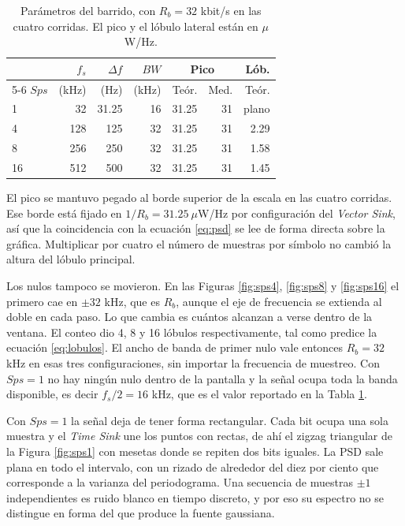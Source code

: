 \documentclass[twocolumn]{IEEEtran}
\begin{document}
\begin{table}[!ht]
\centering
\caption{Parámetros del barrido, con $R_b = 32$ kbit/s en las cuatro corridas. El pico y el lóbulo lateral están en $\mu$W/Hz.}
\label{tab:barrido}
\footnotesize
\begin{tabular}{@{}lrrrrrr@{}}
\toprule
 & $f_s$ & $\Delta f$ & $BW$ & \multicolumn{2}{c}{\textbf{Pico}} & \textbf{Lób.} \\
\cmidrule(lr){5-6}
$Sps$ & (kHz) & (Hz) & (kHz) & Teór. & Med. & Teór. \\
\midrule
1  & 32  & 31.25 & 16 & 31.25 & 31 & plano \\
4  & 128 & 125   & 32 & 31.25 & 31 & 2.29 \\
8  & 256 & 250   & 32 & 31.25 & 31 & 1.58 \\
16 & 512 & 500   & 32 & 31.25 & 31 & 1.45 \\
\bottomrule
\end{tabular}
\end{table}

El pico se mantuvo pegado al borde superior de la escala en las cuatro corridas. Ese borde está fijado en $1/R_b = 31.25\ \mu$W/Hz por configuración del \textit{Vector Sink}, así que la coincidencia con la ecuación \eqref{eq:psd} se lee de forma directa sobre la gráfica. Multiplicar por cuatro el número de muestras por símbolo no cambió la altura del lóbulo principal.

Los nulos tampoco se movieron. En las Figuras \ref{fig:sps4}, \ref{fig:sps8} y \ref{fig:sps16} el primero cae en $\pm 32$ kHz, que es $R_b$, aunque el eje de frecuencia se extienda al doble en cada paso. Lo que cambia es cuántos alcanzan a verse dentro de la ventana. El conteo dio 4, 8 y 16 lóbulos respectivamente, tal como predice la ecuación \eqref{eq:lobulos}. El ancho de banda de primer nulo vale entonces $R_b = 32$ kHz en esas tres configuraciones, sin importar la frecuencia de muestreo. Con $Sps = 1$ no hay ningún nulo dentro de la pantalla y la señal ocupa toda la banda disponible, es decir $f_s/2 = 16$ kHz, que es el valor reportado en la Tabla \ref{tab:barrido}.

Con $Sps = 1$ la señal deja de tener forma rectangular. Cada bit ocupa una sola muestra y el \textit{Time Sink} une los puntos con rectas, de ahí el zigzag triangular de la Figura \ref{fig:sps1} con mesetas donde se repiten dos bits iguales. La PSD sale plana en todo el intervalo, con un rizado de alrededor del diez por ciento que corresponde a la varianza del periodograma. Una secuencia de muestras $\pm 1$ independientes es ruido blanco en tiempo discreto, y por eso su espectro no se distingue en forma del que produce la fuente gaussiana.
\end{document}
